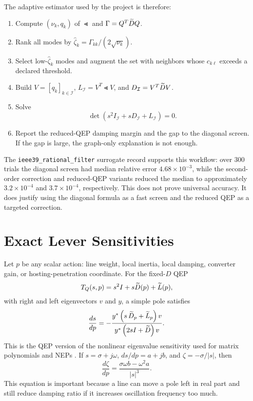 The adaptive estimator used by the project is therefore:
\begin{enumerate}
\item Compute \((\nu_k,q_k)\) of \(\Lt\) and \(\Gamma=Q^T\widetilde D Q\).
\item Rank all modes by \(\hat\zeta_k=\Gamma_{kk}/(2\sqrt{\nu_k})\).
\item Select low-\(\hat\zeta_k\) modes and augment the set with neighbors whose
\(c_{k\ell}\) exceeds a declared threshold.
\item Build \(V=[q_k]_{k\in\mathcal I}\), \(L_{\mathcal I}=V^T\Lt V\), and
\(D_{\mathcal I}=V^T\widetilde D V\).
\item Solve
\[
  \det(s^2I_{\mathcal I}+sD_{\mathcal I}+L_{\mathcal I})=0.
\]
\item Report the reduced-QEP damping margin and the gap to the diagonal
screen. If the gap is large, the graph-only explanation is not enough.
\end{enumerate}

The \texttt{ieee39\_rational\_filter} surrogate record supports this workflow:
over 300 trials the diagonal screen had median relative error
\(4.68\times10^{-3}\), while the second-order correction and reduced-QEP
variants reduced the median to approximately \(3.2\times10^{-4}\) and
\(3.7\times10^{-4}\), respectively. This does not prove universal accuracy. It
does justify using the diagonal formula as a fast screen and the reduced QEP as
a targeted correction.

\section{Exact Lever Sensitivities}

Let \(p\) be any scalar action: line weight, local inertia, local damping,
converter gain, or hosting-penetration coordinate. For the fixed-\(D\) QEP
\[
  T_Q(s,p)=s^2I+s\widetilde D(p)+\widetilde L(p),
\]
with right and left eigenvectors \(v\) and \(y\), a simple pole satisfies
\begin{equation}
  \frac{ds}{dp}
  =
  -
  \frac{y^*\left(s\,\widetilde D_p+\widetilde L_p\right)v}
       {y^*\left(2sI+\widetilde D\right)v}.
  \label{eq:integrated_qep_sensitivity}
\end{equation}
This is the QEP version of the nonlinear eigenvalue sensitivity used for
matrix polynomials and NEPs \cite{tisseur2001qep,guettel2017nep,beyn2012integral}.
If \(s=\sigma+j\omega\), \(ds/dp=a+jb\), and
\(\zeta=-\sigma/|s|\), then
\begin{equation}
  \frac{d\zeta}{dp}
  =
  \frac{\sigma\omega b-\omega^2a}{|s|^3}.
  \label{eq:zeta_from_pole_sensitivity}
\end{equation}
This equation is important because a line can move a pole left in real part
and still reduce damping ratio if it increases oscillation frequency too much.

